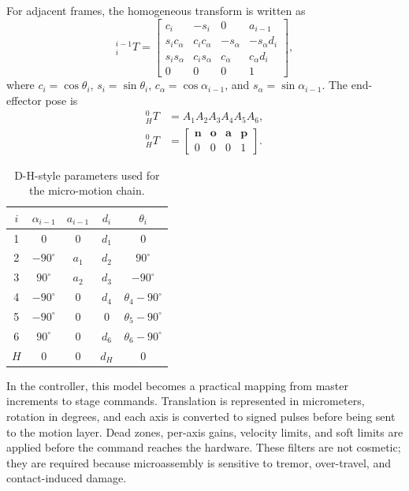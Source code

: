 \documentclass[10pt,twocolumn,letterpaper]{article}
\begin{document}
For adjacent frames, the homogeneous transform is written as
\begin{equation}
{}^{i-1}_{i}T =
\begin{bmatrix}
c_i & -s_i & 0 & a_{i-1}\\
s_ic_{\alpha} & c_ic_{\alpha} & -s_{\alpha} & -s_{\alpha}d_i\\
s_is_{\alpha} & c_is_{\alpha} & c_{\alpha} & c_{\alpha}d_i\\
0 & 0 & 0 & 1
\end{bmatrix},
\end{equation}
where $c_i=\cos\theta_i$, $s_i=\sin\theta_i$,
$c_{\alpha}=\cos\alpha_{i-1}$, and
$s_{\alpha}=\sin\alpha_{i-1}$. The end-effector pose is
\begin{align}
{}^{0}_{H}T &= A_1A_2A_3A_4A_5A_6,\\
{}^{0}_{H}T &=
\begin{bmatrix}
\mathbf{n} & \mathbf{o} & \mathbf{a} & \mathbf{p}\\
0 & 0 & 0 & 1
\end{bmatrix}.
\end{align}

\begin{table}[t]
  \centering
  \small
  \caption{D-H-style parameters used for the micro-motion chain.}
  \label{tab:dh}
  \begin{tabular}{@{}ccccc@{}}
    \toprule
    $i$ & $\alpha_{i-1}$ & $a_{i-1}$ & $d_i$ & $\theta_i$ \\
    \midrule
    1 & $0$ & $0$ & $d_1$ & $0$ \\
    2 & $-90^\circ$ & $a_1$ & $d_2$ & $90^\circ$ \\
    3 & $90^\circ$ & $a_2$ & $d_3$ & $-90^\circ$ \\
    4 & $-90^\circ$ & $0$ & $d_4$ & $\theta_4-90^\circ$ \\
    5 & $-90^\circ$ & $0$ & $0$ & $\theta_5-90^\circ$ \\
    6 & $90^\circ$ & $0$ & $d_6$ & $\theta_6-90^\circ$ \\
    $H$ & $0$ & $0$ & $d_H$ & $0$ \\
    \bottomrule
  \end{tabular}
\end{table}

In the controller, this model becomes a practical mapping from master
increments to stage commands. Translation is represented in micrometers,
rotation in degrees, and each axis is converted to signed pulses before
being sent to the motion layer. Dead zones, per-axis gains, velocity
limits, and soft limits are applied before the command reaches the
hardware. These filters are not cosmetic; they are required because
microassembly is sensitive to tremor, over-travel, and contact-induced
damage.
\end{document}
